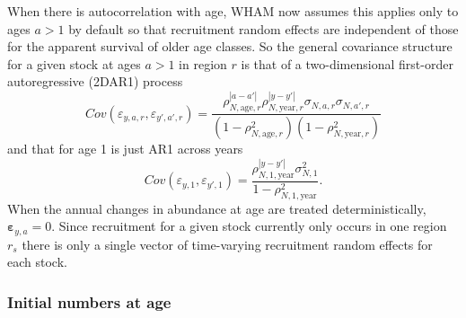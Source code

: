 \documentclass[
]{article}
\begin{document}
When there is autocorrelation with age, WHAM now assumes this applies only to ages \(a>1\) by default so that recruitment random effects are independent of those for the apparent survival of older age classes. So the general covariance structure for a given stock at ages \(a>1\) in region \(r\) is that of a two-dimensional first-order autoregressive (2DAR1) process
\begin{equation*}
  Cov\left(\varepsilon_{y,a,r},\varepsilon_{y',a',r}\right) =   \frac{\rho_{N,\text{age},r}^{|a-a'|}\rho_{N,\text{year},r}^{|y-y'|}\sigma_{N,a,r}\sigma_{N,a',r}}{\left(1 -  \rho_{N,\text{age},r}^2\right)\left(1 - \rho_{N,\text{year},r}^2\right)} 
\end{equation*}
and that for age 1 is just AR1 across years
\begin{equation*}
  Cov\left(\varepsilon_{y,1},\varepsilon_{y',1}\right) =   \frac{\rho_{N,1,\text{year}}^{|y-y'|}\sigma^2_{N,1}}{1 - \rho_{N,1,\text{year}}^2}.
\end{equation*}
When the annual changes in abundance at age are treated deterministically, \(\boldsymbol{\varepsilon}_{y,a} = 0\). Since recruitment for a given stock currently only occurs in one region \(r_s\) there is only a single vector of time-varying recruitment random effects for each stock.

\hypertarget{initial-numbers-at-age}{%
\subsubsection*{Initial numbers at age}\label{initial-numbers-at-age}}
\end{document}
